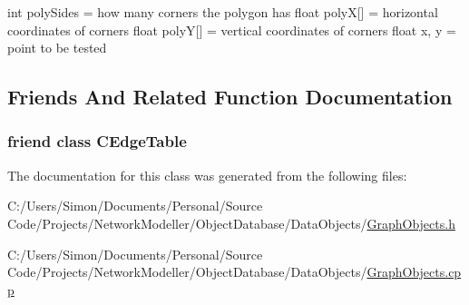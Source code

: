 int poly\+Sides = how many corners the polygon has float poly\+X\mbox{[}\mbox{]} = horizontal coordinates of corners float poly\+Y\mbox{[}\mbox{]} = vertical coordinates of corners float x, y = point to be tested 

\subsection{Friends And Related Function Documentation}
\hypertarget{class_c_edge_afb64c52eb3833710d8b813698ec97179}{}
\subsubsection[{C\+Edge\+Table}]{\setlength{\rightskip}{0pt plus 5cm}friend class {\bf C\+Edge\+Table}\hspace{0.3cm}{\ttfamily [friend]}}\label{class_c_edge_afb64c52eb3833710d8b813698ec97179}


The documentation for this class was generated from the following files\+:\begin{DoxyCompactItemize}
\item 
C\+:/\+Users/\+Simon/\+Documents/\+Personal/\+Source Code/\+Projects/\+Network\+Modeller/\+Object\+Database/\+Data\+Objects/\hyperlink{_graph_objects_8h}{Graph\+Objects.\+h}\item 
C\+:/\+Users/\+Simon/\+Documents/\+Personal/\+Source Code/\+Projects/\+Network\+Modeller/\+Object\+Database/\+Data\+Objects/\hyperlink{_graph_objects_8cpp}{Graph\+Objects.\+cpp}\end{DoxyCompactItemize}
